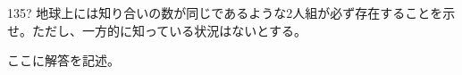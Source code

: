 \begin{prob}{135}{\hosi ?}{}
 地球上には知り合いの数が同じであるような2人組が必ず存在することを示せ。ただし、一方的に知っている状況はないとする。
\end{prob}
ここに解答を記述。